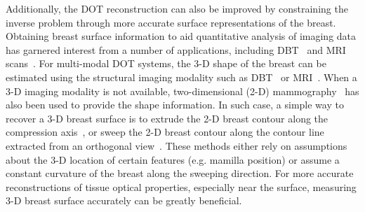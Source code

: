 Additionally, the \ac{DOT} reconstruction can also be improved by constraining the inverse problem through more accurate surface representations of the breast. Obtaining breast surface information to aid quantitative analysis of imaging data has garnered interest from a number of applications, including \ac{DBT}~\cite{Rodriguez2017} and \ac{MRI} scans~\cite{Pallone2014, Ortiz2012}. For multi-modal \ac{DOT} systems, the 3-D shape of the breast can be estimated using the structural imaging modality such as \ac{DBT}~\cite{Fang2011} or \ac{MRI}~\cite{Brooksby2006}. When a 3-D imaging modality is not available, two-dimensional (2-D) mammography~\cite{Deng2015a} has also been used to provide the shape information. In such case, a simple way to recover a 3-D breast surface is to extrude the 2-D breast contour along the compression axis~\cite{Kruger2013, Kalbhen1999}, or sweep the 2-D breast contour along the contour line extracted from an orthogonal view~\cite{Kita1998}. These methods either rely on assumptions about the 3-D location of certain features (e.g. mamilla position) or assume a constant curvature of the breast along the sweeping direction. For more accurate reconstructions of tissue optical properties, especially near the surface, measuring 3-D breast surface accurately can be greatly beneficial.

